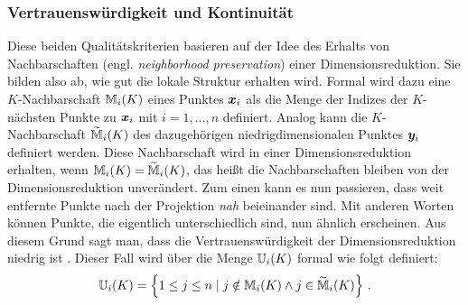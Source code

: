
\subsubsection{Vertrauenswürdigkeit und Kontinuität}
\label{ch:Vergleich:sec:Methodik:subsec:Qualitaetskriterien:TC}
Diese beiden Qualitätskriterien basieren auf der Idee des Erhalts von Nachbarschaften (engl.
\textit{neighborhood preservation}) einer Dimensionsreduktion. Sie bilden also ab, wie gut die
lokale Struktur erhalten wird. Formal wird dazu eine $K$-Nachbarschaft $\mathbb{M}_i(K)$ eines Punktes $\bm{x}_i$ als die Menge der Indizes der $K$-nächsten Punkte zu $\bm{x}_i$ mit $i = 1, \ldots, n$ definiert.
Analog kann die $K$-Nachbarschaft $\widetilde{\mathbb{M}}_i(K)$ des dazugehörigen niedrigdimensionalen
Punktes $\bm{y}_i$ definiert werden. Diese Nachbarschaft wird in einer Dimensionsreduktion
erhalten, wenn $\mathbb{M}_i(K) = \widetilde{\mathbb{M}}_i(K)$, das heißt die Nachbarschaften bleiben von
der Dimensionsreduktion unverändert. Zum einen kann es nun passieren, dass weit entfernte Punkte nach der Projektion \textit{nah}
beieinander sind. Mit anderen Worten können Punkte, die eigentlich unterschiedlich sind, nun
ähnlich erscheinen. Aus diesem Grund sagt man, dass die Vertrauenswürdigkeit der
Dimensionsreduktion niedrig ist \parencite[486 -- 487]{Venna.2001}. Dieser Fall wird über die Menge $\mathbb{U}_i(K)$ formal wie folgt
definiert:
\begin{equation}
	\mathbb{U}_i(K) =  \left\{ 1 \leq j \leq n \mid j \notin \mathbb{M}_i(K) \land j \in \widetilde{\mathbb{M}}_i(K) \right\} \, .
\end{equation}

